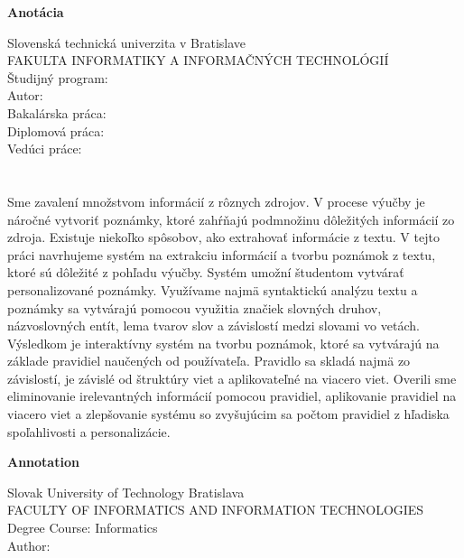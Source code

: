 \newpage
\thispagestyle{plain}
\begin{center}
\begin{Large}
\textbf{Anotácia} \\
\end{Large}
\end{center}
Slovenská technická univerzita v Bratislave \\
FAKULTA INFORMATIKY A INFORMAČNÝCH TECHNOLÓGIÍ \\
\noindent
Študijný program: \Program \\
\noindent
Autor: \Author \\
{
	{Bakalárska práca: }\Title \\
}
{
	{Diplomová práca: }\Title \\
}
Vedúci práce: \Supervisor \\
\Month \Year \\
\noindent
\\
Sme zavalení množstvom informácií z rôznych zdrojov. V procese výučby je náročné vytvoriť poznámky, ktoré zahŕňajú podmnožinu dôležitých informácií zo zdroja. Existuje niekoľko spôsobov, ako extrahovať informácie z textu. V tejto práci navrhujeme systém na extrakciu informácií a tvorbu poznámok z textu, ktoré sú dôležité z pohľadu výučby. Systém umožní študentom vytvárať personalizované poznámky. Využívame najmä syntaktickú analýzu textu a poznámky sa vytvárajú pomocou využitia značiek slovných druhov, názvoslovných entít, lema tvarov slov a závislostí medzi slovami vo vetách. Výsledkom je interaktívny systém na tvorbu poznámok, ktoré sa vytvárajú na základe pravidiel naučených od používateľa. Pravidlo sa skladá najmä zo závislostí, je závislé od štruktúry viet a aplikovateľné na viacero viet. Overili sme eliminovanie irelevantných informácií pomocou pravidiel, aplikovanie pravidiel na viacero viet a zlepšovanie systému so zvyšujúcim sa počtom pravidiel z hľadiska spoľahlivosti a personalizácie.
\newpage
\thispagestyle{plain}
\begin{center}
\begin{Large}
\textbf{Annotation} \\
\end{Large}
\end{center}
Slovak University of Technology Bratislava \\
FACULTY OF INFORMATICS AND INFORMATION TECHNOLOGIES \\
\noindent
Degree Course: Informatics \\
\noindent
Author: \Author \\
